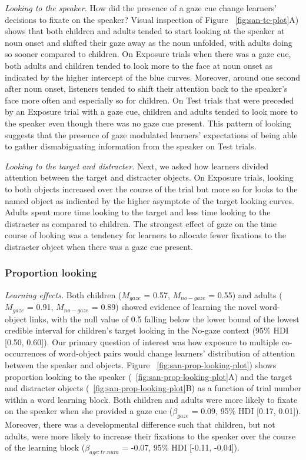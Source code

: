 \documentclass[man,floatsintext]{apa6}
\begin{document}
\emph{Looking to the speaker.} How did the presence of a gaze cue change
learners' decisions to fixate on the speaker? Visual inspection of
Figure ~\ref{fig:san-tc-plot}A) shows that both children and adults
tended to start looking at the speaker at noun onset and shifted their
gaze away as the noun unfolded, with adults doing so sooner compared to
children. On Exposure trials when there was a gaze cue, both adults and
children tended to look more to the face at noun onset as indicated by
the higher intercept of the blue curves. Moreover, around one second
after noun onset, listeners tended to shift their attention back to the
speaker's face more often and especially so for children. On Test trials
that were preceded by an Exposure trial with a gaze cue, children and
adults tended to look more to the speaker even though there was no gaze
cue present. This pattern of looking suggests that the presence of gaze
modulated learners' expectations of being able to gather dismabiguating
information from the speaker on Test trials.

\emph{Looking to the target and distracter.} Next, we asked how learners
divided attention between the target and distracter objects. On Exposure
trials, looking to both objects increased over the course of the trial
but more so for looks to the named object as indicated by the higher
asymptote of the target looking curves. Adults spent more time looking
to the target and less time looking to the distracter as compared to
children. The strongest effect of gaze on the time course of looking was
a tendency for learners to allocate fewer fixations to the distracter
object when there was a gaze cue present.

\subsubsection{Proportion looking}\label{proportion-looking}

\emph{Learning effects.} Both children (\(M_{gaze}\) = 0.57,
\(M_{no-gaze}\) = 0.55) and adults (\(M_{gaze}\) = 0.91, \(M_{no-gaze}\)
= 0.89) showed evidence of learning the novel word-object links, with
the null value of 0.5 falling below the lower bound of the lowest
credible interval for children's target looking in the No-gaze context
(95\% HDI {[}0.50, 0.60{]}). Our primary question of interest was how
exposure to multiple co-occurrences of word-object pairs would change
learners' distribution of attention between the speaker and objects.
Figure ~\ref{fig:san-prop-looking-plot}) shows proportion looking to the
speaker (~\ref{fig:san-prop-looking-plot}A) and the target and
distracter objects (~\ref{fig:san-prop-looking-plot}B) as a function of
trial number within a word learning block. Both children and adults were
more likely to fixate on the speaker when she provided a gaze cue
(\(\beta_{gaze}\) = 0.09, 95\% HDI {[}0.17, 0.01{]}). Moreover, there
was a developmental difference such that children, but not adults, were
more likely to increase their fixations to the speaker over the course
of the learning block (\(\beta_{age:tr.num}\) = -0.07, 95\% HDI
{[}-0.11, -0.04{]}).
\end{document}
